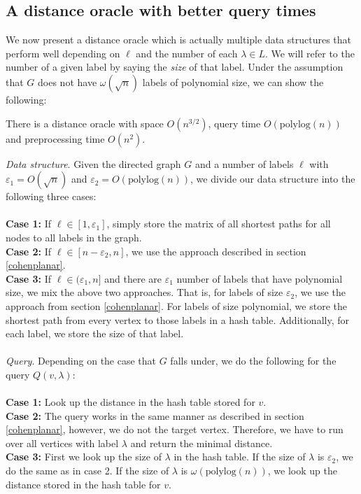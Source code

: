 \subsection{A distance oracle with better query times}\label{oracle2}
We now present a distance oracle which is actually multiple data structures that perform
well depending on $\ell$ and the number of each $\lambda\in L$. We will refer to the
number of a given label by saying the \textit{size} of that label. Under the assumption
that $G$ does not have $\omega(\sqrt{n})$ labels of polynomial size, we can show the
following:
\begin{thm}\label{thm2}
  There is a distance oracle with space $O(n^{3/2})$, query time $O(\text{polylog}(n))$ and
  preprocessing time $O(n^2)$.
\end{thm}
\textit{Data structure}. Given the directed graph $G$ and a number of labels $\ell$ with
$\varepsilon_1 = O(\sqrt{n})$ and $\varepsilon_2=O(\text{polylog}(n))$, we divide our
data structure into the following three cases: \\
\\
\textbf{Case 1:} If $\ell\in [1, \varepsilon_1]$, simply store the matrix of all shortest paths for all nodes to all
labels in the graph. \\
\textbf{Case 2:} If $\ell\in [n-\varepsilon_2, n]$, we use the approach described in section
\ref{cohenplanar}. \\
\textbf{Case 3:} If $\ell\in (\varepsilon_1, n]$ and there are $\varepsilon_1$ number of labels that have
polynomial size, we mix
the above two approaches. That is, for labels of size $\varepsilon_2$, we use the
approach from section \ref{cohenplanar}. For labels of size polynomial, we store the
shortest path from every vertex to those labels in a hash table. Additionally, for each
label, we store the size of that label. \\
\\
\textit{Query}. Depending on the case that $G$ falls under, we do the following for the
query $Q(v, \lambda)$: \\
\\
\textbf{Case 1:} Look up the distance in the hash table stored for $v$. \\
\textbf{Case 2:} The query works in the same manner as described in section
\ref{cohenplanar}, however, we do not the target vertex. Therefore, we have to run over
all vertices with label $\lambda$ and return the minimal distance. \\
\textbf{Case 3:} First we look up the size of $\lambda$ in the hash table. If the size of
$\lambda$ is $\varepsilon_2$, we do the same as in case 2. If the size of $\lambda$ is
$\omega(\text{polylog}(n))$, we look up the distance stored in the hash table for $v$.

